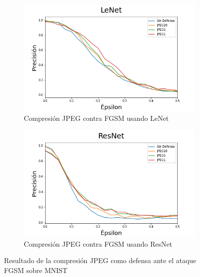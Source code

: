\begin{figure}[h!]
    \centering
    \begin{subfigure}[b]{0.49\textwidth}
        \centering
        \includegraphics[width=\textwidth]{images/jpeg/jpegdefense_vs_epsilon_linear.png}
        \caption{Compresión JPEG contra FGSM usando LeNet}
    \end{subfigure}
    \begin{subfigure}[b]{0.49\textwidth}
        \centering
        \includegraphics[width=\textwidth]{images/jpeg/jpegdefense_vs_epsilon_nonlinear.png}
        \caption{Compresión JPEG contra FGSM usando ResNet}
    \end{subfigure}
    \caption{Resultado de la compresión JPEG como defensa ante el ataque FGSM sobre MNIST}
    \label{jpeg_def}
\end{figure}

